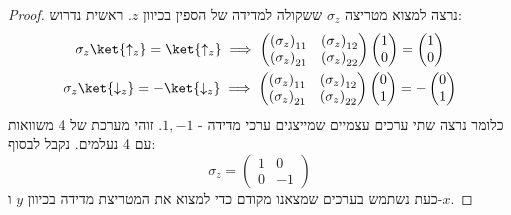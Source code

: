 \documentclass{tstextbook}
\begin{document}
\begin{proof}
נרצה למצוא מטריצה \(\sigma_{z}\) ששקולה למדידה של הספין בכיוון \(z\). ראשית נדרוש:
\begin{gather*}\sigma _{z}\ket{\uparrow_{z}} =\ket{\uparrow_{z}}\implies \begin{pmatrix}\left( \sigma_z \right)_{11} & \left( \sigma_{z} \right)_{12} \\\left( \sigma_{z} \right)_{21} & \left( \sigma_z \right)_{22}\end{pmatrix}\begin{pmatrix}1\\0\end{pmatrix}=\begin{pmatrix}1\\0\end{pmatrix}\\\sigma_{z}\ket{\downarrow_{z}} =-\ket{\downarrow_{z}} \implies   \begin{pmatrix}\left( \sigma_{z} \right)_{11} & \left( \sigma_{z} \right)_{12} \\\left( \sigma_{z} \right)_{21} & \left( \sigma_{z} \right)_{22}\end{pmatrix}\begin{pmatrix}0\\1\end{pmatrix}=-\begin{pmatrix}0\\1\end{pmatrix}
\end{gather*}
כלומר נרצה שתי ערכים עצמיים שמייצגים ערכי מדידה - \(1,-1\). זוהי מערכת של 4 משוואות עם 4 נעלמים. נקבל לבסוף:
$$\sigma_{z}=\begin{pmatrix}1 & 0 \\0 & -1
\end{pmatrix}$$
כעת נשתמש בערכים שמצאנו מקודם כדי למצוא את המטריצת מדידה בכיוון \(y\) ו-\(x\).

\end{proof}
\end{document}
